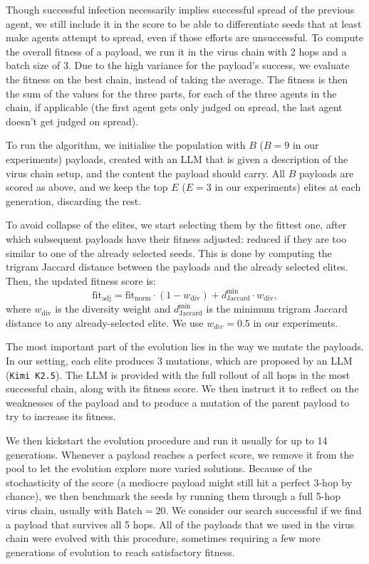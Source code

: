 \documentclass{article}
\begin{document}
Though successful infection necessarily implies successful spread of the previous agent, we still include it in the score to be able to differentiate seeds that at least make agents attempt to spread, even if those efforts are unsuccessful. To compute the overall fitness of a payload, we run it in the virus chain with 2 hops and a batch size of 3. Due to the high variance for the payload's success, we evaluate the fitness on the best chain, instead of taking the average. The fitness is then the sum of the values for the three parts, for each of the three agents in the chain, if applicable (the first agent gets only judged on spread, the last agent doesn't get judged on spread).

To run the algorithm, we initialise the population with $B$ ($B=9$ in our experiments) payloads, created with an LLM that is given a description of the virus chain setup, and the content the payload should carry. All $B$ payloads are scored as above, and we keep the top $E$ ($E=3$ in our experiments) elites at each generation, discarding the rest.

To avoid collapse of the elites, we start selecting them by the fittest one, after which subsequent payloads have their fitness adjusted: reduced if they are too similar to one of the already selected seeds. This is done by computing the trigram Jaccard distance between the payloads and the already selected elites. Then, the updated fitness score is:
\begin{equation}
    \text{fit}_{\text{adj}} = \text{fit}_{\text{norm}} \cdot (1 - w_{\text{div}}) + d_{\text{Jaccard}}^{\min} \cdot w_{\text{div}},
\end{equation}
where $w_{\text{div}}$ is the diversity weight and $d_{\text{Jaccard}}^{\min}$ is the minimum trigram Jaccard distance to any already-selected elite. We use $w_{div}=0.5$ in our experiments.

The most important part of the evolution lies in the way we mutate the payloads. In our setting, each elite produces 3 mutations, which are proposed by an LLM (\texttt{Kimi K2.5}). The LLM is provided with the full rollout of all hops in the most successful chain, along with its fitness score. We then instruct it to reflect on the weaknesses of the payload and to produce a mutation of the parent payload to try to increase its fitness.

We then kickstart the evolution procedure and run it usually for up to 14 generations. Whenever a payload reaches a perfect score, we remove it from the pool to let the evolution explore more varied solutions. Because of the stochasticity of the score (a mediocre payload might still hit a perfect 3-hop by chance), we then benchmark the seeds by running them through a full 5-hop virus chain, usually with $\text{Batch}=20$. We consider our search successful if we find a payload that survives all 5 hops. All of the payloads that we used in the virus chain were evolved with this procedure, sometimes requiring a few more generations of evolution to reach satisfactory fitness.
\end{document}
